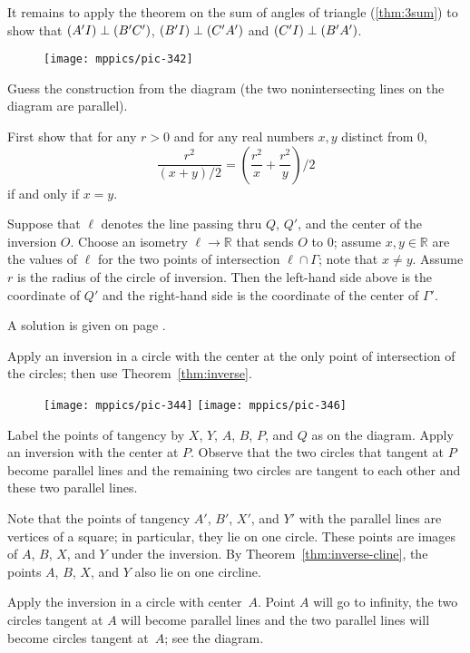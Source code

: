 It remains to apply the theorem on the sum of angles of triangle (\ref{thm:3sum})
to show that $(A'I)\z\perp (B'C')$, 
$(B'I)\z\perp (C'A')$
and
$(C'I)\z\perp (B'A')$.

{

\begin{wrapfigure}{r}{34mm}
\vskip-0mm
\centering
\texttt{[image: mppics/pic-342]}
\end{wrapfigure}

Guess the construction from the diagram (the two nonintersecting lines on the diagram are parallel).

First show that for any $r>0$ and for any real numbers $x,y$ distinct from $0$,
$$\frac{r^2}{(x+y)/2}
=
\left(\frac {r^2}x+\frac {r^2}y\right)/2$$
if and only if $x=y$.

}

Suppose that $\ell$ denotes the line passing thru $Q$, $Q'$, and the center of the inversion $O$.
Choose an isometry $\ell\to\mathbb{R}$ that sends $O$ to $0$;
assume $x,y\in \mathbb{R}$ are the values of $\ell$ for the two points of intersection $\ell\cap\Gamma$;
note that $x\ne y$.
Assume $r$ is the radius of the circle of inversion.
Then the left-hand side above is the coordinate of $Q'$ 
and the right-hand side is the coordinate of the center of $\Gamma'$.

A solution is given on page \pageref{page:solution-for-ex:circumtool}.

Apply an inversion in a circle with the center at the only point of intersection of the circles;
then use Theorem~\ref{thm:inverse}.

{

\begin{wrapfigure}[15]{r}{55mm}
\vskip-8mm
\centering
\texttt{[image: mppics/pic-344]}
\vskip6mm
\texttt{[image: mppics/pic-346]}
\end{wrapfigure}

Label the points of tangency by $X$, $Y$, $A$, $B$, $P$, and $Q$ as on the diagram.
Apply an inversion with the center at $P$. 
Observe that the two circles that tangent at $P$ become parallel lines and 
the remaining two circles are tangent to each other and these two parallel lines.

Note that the points of tangency $A'$, $B'$, $X'$, and $Y'$ with the parallel lines are vertices of a square;
in particular, they lie on one circle.
These points are images of $A$, $B$, $X$, and $Y$ under the inversion.
By Theorem~\ref{thm:inverse-cline}, the points $A$, $B$, $X$, and $Y$ also lie on one circline.

Apply the inversion in a circle with center~$A$. 
Point $A$ will go to infinity, the two circles tangent at $A$ will become parallel lines
and the two parallel lines will become circles tangent at~$A$; see the diagram.

}

